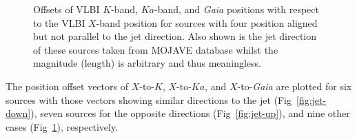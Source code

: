 \documentclass{aa}
\begin{document}
\begin{appendix}
\begin{figure}[hbtp]
        \caption[]{\label{fig:other}
            Offsets of VLBI $K$-band, $Ka$-band, and {\it Gaia} positions with respect to the VLBI $X$-band position for sources with four position aligned but not parallel to the jet direction.
            Also shown is the jet direction of these sources taken from MOJAVE database whilst the magnitude (length) is arbitrary and thus meaningless.
        }
    \end{figure}

    The position offset vectors of $X$-to-$K$, $X$-to-$Ka$, and $X$-to-\textit{Gaia} are plotted for six sources with those vectors showing similar directions to the jet (Fig~\ref{fig:jet-down}), seven sources for the opposite directions (Fig~\ref{fig:jet-up}), and nine other cases (Fig~\ref{fig:other}), respectively.


\end{appendix}
\end{document}
